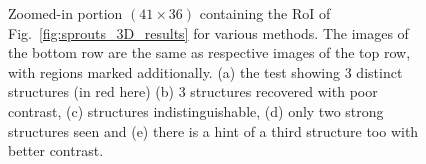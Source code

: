 \documentclass[journal]{IEEEtran}
\begin{document}
\begin{figure}[!h]
              \hfill
                \hfill
{}
\caption{Zoomed-in portion $(41 \times 36)$ containing the RoI of Fig.~\ref{fig:sprouts_3D_results} for various methods. The images of the bottom row are the same as respective images of the top row, with regions marked additionally. (a) the test showing 3 distinct structures (in red here) (b) 3 structures recovered with poor contrast, (c) structures indistinguishable, (d) only two strong structures seen and (e) there is a hint of a third structure too with better contrast.}
\label{fig:sprouts_zoomed_3D_results}
\end{figure}
\end{document}
